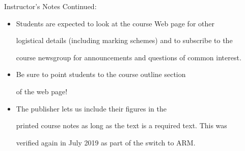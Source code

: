 \begin{frame}[fragile] 

Instructor's Notes Continued: 

\begin{itemize} 

\item Students are expected to look at the course Web page for other 

	logistical details (including marking schemes) and to subscribe to the 

	course newsgroup for announcements and questions of common interest. 

\item Be sure to point students to the course outline section 

  of the web page! 

\item The publisher lets us include their figures in the 

  printed course notes as long as the text is a required text.  This was 

  verified again in July 2019 as part of the switch to ARM. 

\end{itemize} 

\end{frame} 

\fi\ENotes 



